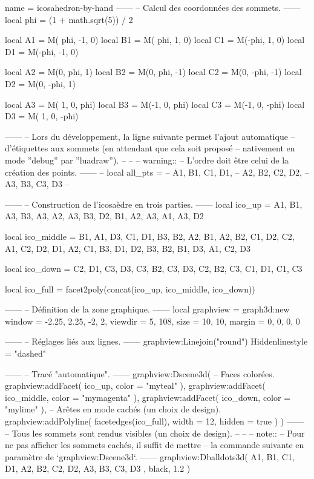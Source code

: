 \documentclass{standalone}
\begin{document}
\begin{luadraw}{name = icosahedron-by-hand}
------
-- Calcul des coordonnées des sommets.
------
local phi = (1 + math.sqrt(5)) / 2

local A1 = M( phi, -1, 0)
local B1 = M( phi,  1, 0)
local C1 = M(-phi,  1, 0)
local D1 = M(-phi, -1, 0)

local A2 = M(0,  phi,  1)
local B2 = M(0,  phi, -1)
local C2 = M(0, -phi, -1)
local D2 = M(0, -phi,  1)

local A3 = M( 1, 0,  phi)
local B3 = M(-1, 0,  phi)
local C3 = M(-1, 0, -phi)
local D3 = M( 1, 0, -phi)

------
-- Lors du développement, la ligne suivante permet l'ajout automatique
-- d'étiquettes aux sommets (en attendant que cela soit proposé
-- nativement en mode ''debug'' par ''luadraw'').
--
--
--  warning::
--      L'ordre doit être celui de la création des points.
------
-- local all_pts = {
--   A1, B1, C1, D1,
--   A2, B2, C2, D2,
--   A3, B3, C3, D3
-- }

------
-- Construction de l'icosaèdre en trois parties.
------
local ico_up = {
  {A1, B1, A3},
  {B3, A3, A2},
  {A3, B3, D2},
  {B1, A2, A3},
  {A1, A3, D2}
}

local ico_middle = {
  {B1, A1, D3},
  {C1, D1, B3},
  {B2, A2, B1},
  {A2, B2, C1},
  {D2, C2, A1},
  {C2, D2, D1},
  {A2, C1, B3},
  {D1, D2, B3},
  {B2, B1, D3},
  {A1, C2, D3}
}

local ico_down = {
  {C2, D1, C3},
  {D3, C3, B2},
  {C3, D3, C2},
  {B2, C3, C1},
  {D1, C1, C3}
}

local ico_full = facet2poly(concat(ico_up, ico_middle, ico_down))

------
-- Définition de la zone graphique.
------
local graphview = graph3d:new{
    window  = {-2.25, 2.25, -2, 2},
    viewdir = {5, 108},
    size    = {10, 10},
    margin  = {0, 0, 0, 0}
}

------
-- Réglages liés aux lignes.
------
graphview:Linejoin("round")
Hiddenlinestyle = "dashed"

------
-- Tracé "automatique".
------
graphview:Dscene3d(
-- Faces colorées.
    graphview:addFacet(
      ico_up,
      {
        color = "myteal"
      }),
    graphview:addFacet(
      ico_middle,
      {
        color = "mymagenta"
      }),
    graphview:addFacet(
      ico_down,
      {
        color = "mylime"
      }),
-- Arêtes en mode cachés (un choix de design).
    graphview:addPolyline(
      facetedges(ico_full),
      {
        width = 12,
        hidden = true
      })
)
------
-- Tous les sommets sont rendus visibles (un choix de design).
--
--
-- note::
--     Pour ne pas afficher les sommets cachés, il suffit de mettre
--     la commande suivante en paramètre de `graphview:Dscene3d`.
------
graphview:Dballdots3d(
  {
    A1, B1, C1, D1,
    A2, B2, C2, D2,
    A3, B3, C3, D3
  },
  black,
  1.2
)


\end{luadraw}
\end{document}
